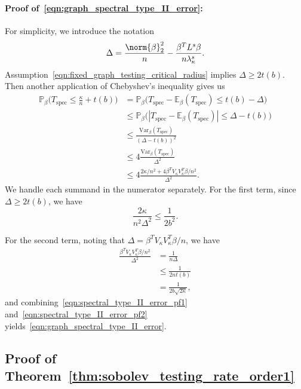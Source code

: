 \documentclass{article}
\newcommand{\abs}[1]{\left \lvert #1 \right \rvert}
\newcommand{\Var}{\mathrm{Var}}
\newcommand{\1}{\mathbf{1}}
\newcommand{\Pbb}{\mathbb{P}}
\newcommand{\Ebb}{\mathbb{E}}
\newcommand{\spec}{\mathrm{spec}}
\theoremstyle{alden}
\theoremstyle{aldenthm}
\theoremstyle{definition}
\theoremstyle{remark}
\begin{document}
\paragraph{Proof of~\eqref{eqn:graph_spectral_type_II_error}:} For simplicity, we introduce the notation
\begin{equation*}
\Delta = \frac{\norm{\beta}_2^2}{n} - \frac{\beta^T L^s \beta}{n\lambda_{\kappa}^s}.
\end{equation*}
Assumption~\eqref{eqn:fixed_graph_testing_critical_radius} implies $\Delta \geq 2 t(b)$. Then another application of Chebyshev's inequality gives us
\begin{align*}
\Pbb_{\beta}\bigl(T_{\spec} \leq \frac{\kappa}{n} + t(b)\bigr) & = \Pbb_{\beta}\bigl(T_{\spec} - \Ebb_{\beta}(T_{\spec}) \leq t(b) - \Delta \bigr) \\
& \leq \Pbb_{\beta}\bigl(\abs{T_{\spec} - \Ebb_{\beta}(T_{\spec})} \leq \Delta - t(b) \bigr) \tag{since $\Delta \geq t(b)$}	\\
& \leq \frac{\Var_{\beta}(T_{\spec})}{(\Delta - t(b))^2} \\
& \leq 4\frac{\Var_{\beta}(T_{\spec})}{\Delta^2} \tag{since $\Delta \geq 2t(b)$} \\
& \leq 4\frac{2\kappa/n^2 + 4\beta^T V_{\kappa} V_{\kappa}^T \beta /n^2}{\Delta^2}.
\end{align*}
We handle each summand in the numerator separately. For the first term, since $\Delta \geq 2 t(b)$, we have
\begin{equation}
\label{eqn:spectral_type_II_error_pf1}
\frac{2\kappa}{n^2\Delta^2} \leq \frac{1}{2b^2}.
\end{equation}

For the second term, noting that $\Delta = \beta^T V_{\kappa} V_{\kappa}^T \beta/n$, we have
\begin{align}
\frac{\beta^T V_{\kappa} V_{\kappa}^T \beta/n^2}{\Delta^2} & = \frac{1}{n\Delta} \nonumber \\
& \leq \frac{1}{2nt(b)} \nonumber \\
& = \frac{1}{2b\sqrt{2\kappa}}, \label{eqn:spectral_type_II_error_pf2}
\end{align}
and combining~\eqref{eqn:spectral_type_II_error_pf1} and~\eqref{eqn:spectral_type_II_error_pf2} yields~\eqref{eqn:graph_spectral_type_II_error}.

\subsection{Proof of Theorem~\ref{thm:sobolev_testing_rate_order1}}
\end{document}
